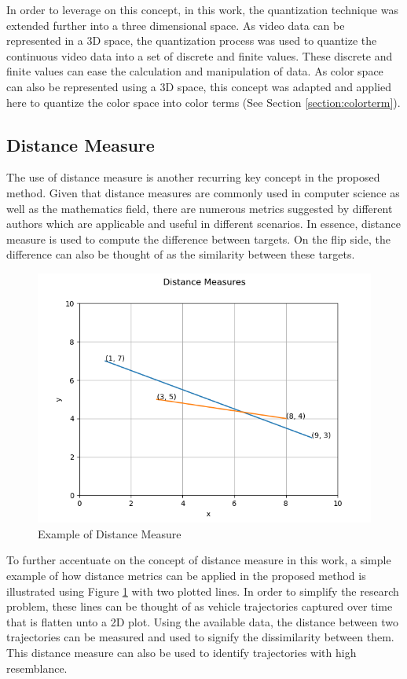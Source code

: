 In order to leverage on this concept, in this work, the quantization technique was extended further into a three dimensional space. As video data can be represented in a 3D space, the quantization process was used to quantize the continuous video data into a set of discrete and finite values. These discrete and finite values can ease the calculation and manipulation of data. As color space can also be represented using a 3D space, this concept was adapted and applied here to quantize the color space into color terms (See Section \ref{section:colorterm}).



\subsection{Distance Measure}
\label{section:distancemeasures}

The use of distance measure is another recurring key concept in the proposed method. Given that distance measures are commonly used in computer science as well as the mathematics field, there are numerous metrics suggested by different authors which are applicable and useful in different scenarios. In essence, distance measure is used to compute the difference between targets. On the flip side, the difference can also be thought of as the similarity between these targets.

\begin{figure}[hbt!]\centering
\includegraphics[width=.7\textwidth]{image/general/distance.png}
\caption{Example of Distance Measure}
\label{fig:distanceMeasure}
\end{figure}

To further accentuate on the concept of distance measure in this work, a simple example of how distance metrics can be applied in the proposed method is illustrated using Figure \ref{fig:distanceMeasure} with two plotted lines. In order to simplify the research problem, these lines can be thought of as vehicle trajectories captured over time that is flatten unto a 2D plot. Using the available data, the distance between two trajectories can be measured and used to signify the dissimilarity between them. This distance measure can also be used to identify trajectories with high resemblance. 

